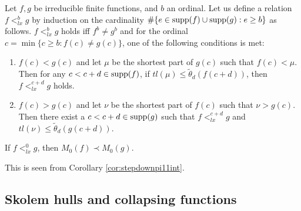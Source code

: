 \documentclass{article}
\begin{document}
\bdf\label{df:lx}
 {\rm 
 Let  $f,g$
 be irreducible finite functions, and $b$ an ordinal.
Let us define a relation $f<^{b}_{lx}g$
by induction on the cardinality $\#\{e\in{\rm supp}(f)\cup{\rm supp}(g): e\geq b\}$ as follows.
$f<^{b}_{lx}g$ holds iff $f^{b}\neq g^{b}$ and
for the ordinal $c=\min\{c\geq b : f(c)\neq g(c)\}$,
one of the following conditions is met:

\begin{enumerate}

\item\label{df:lx.23}
$f(c)<g(c)$ and let $\mu$ be the shortest part of $g(c)$ such that $f(c)<\mu$.
Then for any $c<c+d\in{\rm supp}(f)$,  
if $tl(\mu)\leq\tilde{\theta}_{d}(f(c+d))$, then 
$f<_{lx}^{c+d}g$ holds.


\item\label{df:lx.24}
$f(c)>g(c)$ and let $\nu$ be the shortest part of $f(c)$ such that $\nu>g(c)$.
Then there exist a $c<c+d\in {\rm supp}(g)$ such that
$f<_{lx}^{c+d}g$ and
$tl(\nu)\leq \tilde{\theta}_{d}(g(c+d))$.


\end{enumerate}





}
\edf



\bprp\label{lem:psinucomparison}
If $f<^{0}_{lx}g$, then
$M_{0}(f)\prec M_{0}(g)$.

\eprp
\bprf
This is seen from Corollary \ref{cor:stepdownpi11int}.
\eprf

\subsection{Skolem hulls and collapsing functions}\label{subsec:Skolemh}
\end{document}
